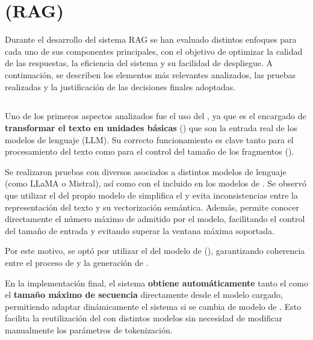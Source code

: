 \section{ (RAG)}

Durante el desarrollo del sistema RAG se han evaluado distintos enfoques para cada uno de sus componentes principales, con el objetivo de optimizar la calidad de las respuestas, la eficiencia del sistema y su facilidad de despliegue. A continuación, se describen los elementos más relevantes analizados, las pruebas realizadas y la justificación de las decisiones finales adoptadas.

\subsection{}

Uno de los primeros aspectos analizados fue el uso del , ya que es el encargado de \textbf{transformar el texto en unidades básicas} () que son la entrada real de los modelos de lenguaje (LLM). Su correcto funcionamiento es clave tanto para el procesamiento del texto como para el control del tamaño de los fragmentos ().

Se realizaron pruebas con diversos  asociados a distintos modelos de lenguaje (como LLaMA o Mistral), así como con el  incluido en los modelos de . Se observó que utilizar el  del propio modelo de  simplifica el  y evita inconsistencias entre la representación del texto y su vectorización semántica. Además, permite conocer directamente el número máximo de  admitido por el modelo, facilitando el control del tamaño de entrada y evitando superar la ventana máxima soportada.

Por este motivo, se optó por utilizar el  del modelo de  (), garantizando coherencia entre el proceso de  y la generación de .

En la implementación final, el sistema  \textbf{obtiene automáticamente} tanto el  \textbf{} como el  \textbf{tamaño máximo de secuencia} directamente desde el modelo cargado, permitiendo adaptar dinámicamente el sistema si se cambia de modelo de . Esto facilita la reutilización del  con distintos modelos sin necesidad de modificar manualmente los parámetros de tokenización.

